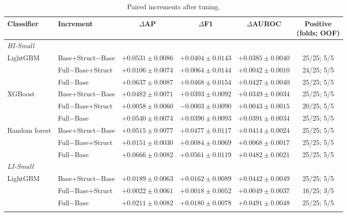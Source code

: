 \begin{table}[htbp]
\centering
\footnotesize
\caption{Paired increments after tuning.}
\label{tab:paired}
\setlength{\tabcolsep}{3.5pt}
\begin{threeparttable}
\begin{tabular}{llcccc}
\toprule
Classifier & Increment & $\Delta$AP & $\Delta$F1 & $\Delta$AUROC & \shortstack{Positive\\(folds; OOF)} \\
\midrule
\multicolumn{6}{l}{\textit{HI-Small}} \\
LightGBM & Base+Struct$-$Base & $\mathbf{+0.0531} \pm 0.0086$ & $+0.0404 \pm 0.0143$ & $+0.0385 \pm 0.0040$ & 25/25; 5/5 \\
 & Full$-$Base+Struct & $+0.0106 \pm 0.0074$ & $+0.0064 \pm 0.0144$ & $+0.0042 \pm 0.0010$ & 24/25; 5/5 \\
 & Full$-$Base & $+0.0637 \pm 0.0087$ & $+0.0468 \pm 0.0154$ & $+0.0427 \pm 0.0040$ & 25/25; 5/5 \\
\addlinespace
XGBoost & Base+Struct$-$Base & $+0.0482 \pm 0.0071$ & $+0.0393 \pm 0.0092$ & $+0.0349 \pm 0.0034$ & 25/25; 5/5 \\
 & Full$-$Base+Struct & $+0.0058 \pm 0.0060$ & $\underline{-0.0003} \pm 0.0090$ & $+0.0043 \pm 0.0015$ & 20/25; 5/5 \\
 & Full$-$Base & $+0.0540 \pm 0.0074$ & $+0.0390 \pm 0.0093$ & $+0.0391 \pm 0.0034$ & 25/25; 5/5 \\
\addlinespace
Random forest & Base+Struct$-$Base & $+0.0515 \pm 0.0077$ & $\mathbf{+0.0477} \pm 0.0117$ & $\mathbf{+0.0414} \pm 0.0024$ & 25/25; 5/5 \\
 & Full$-$Base+Struct & $\mathbf{+0.0151} \pm 0.0030$ & $\mathbf{+0.0084} \pm 0.0069$ & $\mathbf{+0.0068} \pm 0.0017$ & 25/25; 5/5 \\
 & Full$-$Base & $\mathbf{+0.0666} \pm 0.0082$ & $\mathbf{+0.0561} \pm 0.0119$ & $\mathbf{+0.0482} \pm 0.0021$ & 25/25; 5/5 \\
\midrule
\multicolumn{6}{l}{\textit{LI-Small}} \\
LightGBM & Base+Struct$-$Base & $\mathbf{+0.0189} \pm 0.0063$ & $\mathbf{+0.0162} \pm 0.0089$ & $+0.0442 \pm 0.0049$ & 25/25; 5/5 \\
 & Full$-$Base+Struct & $+0.0022 \pm 0.0061$ & $+0.0018 \pm 0.0052$ & $+0.0049 \pm 0.0037$ & 16/25; 3/5 \\
 & Full$-$Base & $\mathbf{+0.0211} \pm 0.0082$ & $+0.0180 \pm 0.0078$ & $+0.0491 \pm 0.0048$ & 25/25; 5/5 \\
\addlinespace

\end{tabular}
\end{threeparttable}
\end{table}
